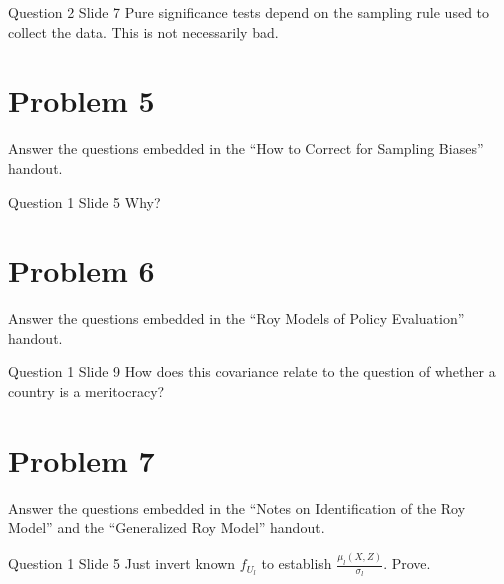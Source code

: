 \documentclass{article}
\begin{document}
\begin{problem}{Question 2 Slide 7}
Pure significance tests depend on the sampling rule used to
collect the data. This is not necessarily bad.
\end{problem}
\begin{solution}
\end{solution}

\newpage

\section*{Problem 5}
Answer the questions embedded in the ``How to Correct for Sampling Biases'' handout.

\begin{problem}{Question 1 Slide 5}
Why?
\end{problem}
\begin{solution}
\end{solution}

\newpage

\section*{Problem 6}
Answer the questions embedded in the ``Roy Models of Policy Evaluation'' handout.

\begin{problem}{Question 1 Slide 9} How does this covariance relate to the question of whether a country is a meritocracy?
\end{problem}
\begin{solution}
\end{solution}


\newpage

\section*{Problem 7}
Answer the questions embedded in the ``Notes on Identification of the Roy Model'' and the ``Generalized Roy Model'' handout.

\begin{problem}{Question 1 Slide 5}
Just invert known $f_{U_{l}}$ to establish $\frac{\mu_{l}(X, Z)}{\sigma_{l}}$. Prove.
\end{problem}
\begin{solution}
\end{solution}
\end{document}
